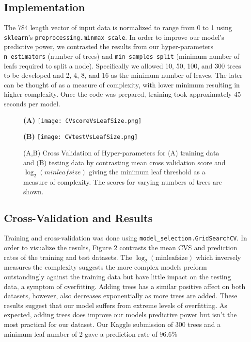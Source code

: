 \documentclass{article}
\begin{document}
\subsection{Implementation}
The 784 length vector of input data is normalized to range from 0 to 1 using \verb+sklearn+'s \verb+preprocessing.minmax_scale+. In order to improve our model's predictive power, we contrasted the results from our hyper-parameters \verb+n_estimators+ (number of trees) and  \verb+min_samples_split+ (minimum number of leafs required to split a node). Specifically we allowed 10, 50, 100, and 300 trees to be developed and 2, 4, 8, and 16 as the minimum number of leaves. The later can be thought of as a measure of complexity, with lower minimum resulting in higher complexity. Once the code was prepared, training took approximately 45 seconds per model.
\begin{figure}[h]
    \centering
    \begin{minipage}[t]{0.45\textwidth}
        \centering
        \textbf{(A)}
        \texttt{[image: CVscoreVsLeafSize.png]}
    \end{minipage}
    \begin{minipage}[t]{0.45\textwidth}
        \centering
        \textbf{(B)}
        \texttt{[image: CVtestVsLeafSize.png]}
    \end{minipage}
\caption{(A,B) Cross Validation of Hyper-parameters for (A) training data and (B) testing data by contrasting mean cross validation score and $\log_2(minleafsize)$ giving the minimum leaf threshold as a measure of complexity. The scores for varying numbers of trees are shown.}
\end{figure}

\subsection{Cross-Validation and Results}
Training and cross-validation was done using \verb+model_selection.GridSearchCV+. In order to visualize the results, Figure 2 contrasts the mean CVS and prediction rates of the training and test datasets. The $\log_2(\text{minleafsize})$ which inversely measures the complexity suggests the more complex models preform outstandingly against the training data but have little impact on the testing data, a symptom of overfitting. Adding trees has a similar positive affect on both datasets, however, also decreases exponentially as more trees are added. These results suggest that our model suffers from extreme levels of overfitting. As expected, adding trees does improve our models predictive power but isn't the most practical for our dataset. Our Kaggle submission of 300 trees and a minimum leaf number of 2 gave a prediction rate of 96.6\%
\end{document}
